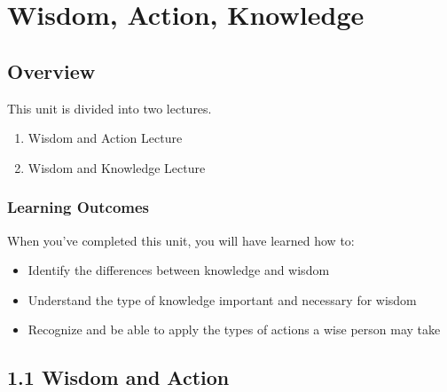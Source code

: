 \documentclass[
]{book}
\providecommand{\tightlist}{%
  \setlength{\itemsep}{0pt}\setlength{\parskip}{0pt}}
\begin{document}
\hypertarget{wisdom-action-knowledge}{%
\chapter{Wisdom, Action, Knowledge}\label{wisdom-action-knowledge}}

\hypertarget{overview}{%
\section*{Overview}\label{overview}}

This unit is divided into two lectures.

\begin{enumerate}
\def\labelenumi{\arabic{enumi}.}
\tightlist
\item
  Wisdom and Action Lecture
\item
  Wisdom and Knowledge Lecture
\end{enumerate}

\hypertarget{learning-outcomes}{%
\subsection*{Learning Outcomes}\label{learning-outcomes}}

When you've completed this unit, you will have learned how to:

\begin{itemize}
\tightlist
\item
  Identify the differences between knowledge and wisdom
\item
  Understand the type of knowledge important and necessary for wisdom
\item
  Recognize and be able to apply the types of actions a wise person may take
\end{itemize}

\hypertarget{wisdom-and-action}{%
\section*{1.1 Wisdom and Action}\label{wisdom-and-action}}
\end{document}

